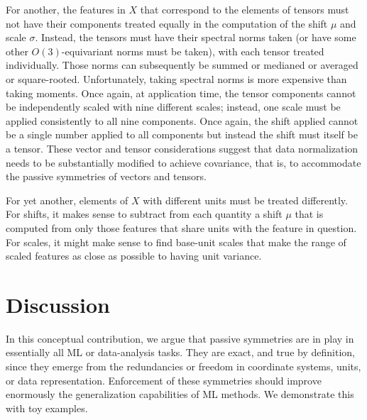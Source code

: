 \documentclass[accepted]{article}
\begin{document}
For another, the features in $X$ that correspond to the elements of tensors must not have their components treated equally in the computation of the shift $\mu$ and scale $\sigma$.
Instead, the tensors must have their spectral norms taken (or have some other $O(3)$-equivariant norms must be taken), with each tensor treated individually.
Those norms can subsequently be summed or medianed or averaged or square-rooted.
Unfortunately, taking spectral norms is more expensive than taking moments.
Once again, at application time, the tensor components cannot be independently scaled with nine different scales; instead, one scale must be applied consistently to all nine components.
Once again, the shift applied cannot be a single number applied to all components but instead the shift must itself be a tensor.
These vector and tensor considerations suggest that data normalization needs to be substantially modified to achieve covariance, that is, to accommodate the passive symmetries of vectors and tensors.

For yet another, elements of $X$ with different units must be treated differently.
For shifts, it makes sense to subtract from each quantity a shift $\mu$ that is computed from only those features that share units with the feature in question.
For scales, it might make sense to find base-unit scales that make the range of scaled features as close as possible to having unit variance.

\section{Discussion}\label{sec:discussion}
In this conceptual contribution,
we argue that passive symmetries are in play in essentially all ML or data-analysis tasks.
They are exact, and true by definition, since they emerge from the redundancies or freedom in coordinate systems, units, or data representation.
Enforcement of these symmetries should improve enormously the generalization capabilities of ML methods.
We demonstrate this with toy examples.
\end{document}
